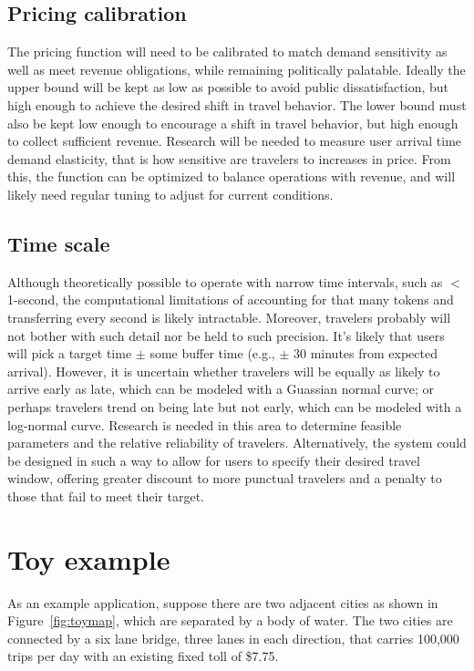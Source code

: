 \documentclass[10pt, letter, twocolumn]{article} %
\begin{document}
\subsection{Pricing calibration}
The pricing function will need to be calibrated to match demand sensitivity as well as meet revenue obligations, while remaining politically palatable. Ideally the upper bound will be kept as low as possible to avoid public dissatisfaction, but high enough to achieve the desired shift in travel behavior. The lower bound must also be kept low enough to encourage a shift in travel behavior, but high enough to collect sufficient revenue. Research will be needed to measure user arrival time demand elasticity, that is how sensitive are travelers to increases in price. From this, the function can be optimized to balance operations with revenue, and will likely need regular tuning to adjust for current conditions. 

\subsection{Time scale}
Although theoretically possible to operate with narrow time intervals, such as $<$1-second, the computational limitations of accounting for that many tokens and transferring every second is likely intractable. Moreover, travelers probably will not bother with such detail nor be held to such precision. It's likely that users will pick a target time $\pm$ some buffer time (e.g., $\pm$ 30 minutes from expected arrival). However, it is uncertain whether travelers will be equally as likely to arrive early as late, which can be modeled with a Guassian normal curve; or perhaps travelers trend on being late but not early, which can be modeled with a log-normal curve. Research is needed in this area to determine feasible parameters and the relative reliability of travelers. Alternatively, the system could be designed in such a way to allow for users to specify their desired travel window, offering greater discount to more punctual travelers and a penalty to those that fail to meet their target.

\section{Toy example}
 As an example application, suppose there are two adjacent cities as shown in Figure~\ref{fig:toymap}, which are separated by a body of water. The two cities are connected by a six lane bridge, three lanes in each direction, that carries 100,000 trips per day with an existing fixed toll of \$7.75.
 
\end{document}
